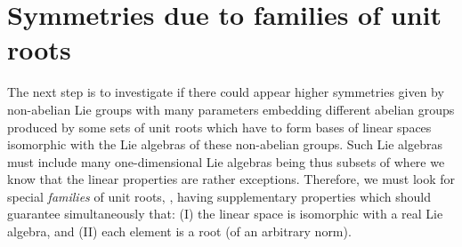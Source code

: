 \documentclass[a4paper,12pt]{article}
\begin{document}
\section{Symmetries due to families of unit roots}

The next step is to investigate if there could appear higher symmetries 
given by non-abelian Lie groups with many parameters embedding different 
abelian groups \coordHE{} produced by some sets of unit roots which have to 
form bases of linear spaces isomorphic with the Lie algebras of these 
non-abelian groups. Such Lie algebras must include many one-dimensional Lie 
algebras \coordHE{} being thus subsets of \coordHE{} where we know that 
the linear properties are rather exceptions. Therefore, we must look for 
special {\em families} of unit roots, \coordHE{}, having supplementary  properties which should guarantee 
simultaneously that: 
(I) the linear space \coordHE{} 
is isomorphic with a real Lie algebra, and (II) each element 
\coordHE{} is a root (of an arbitrary norm). 
\end{document}
